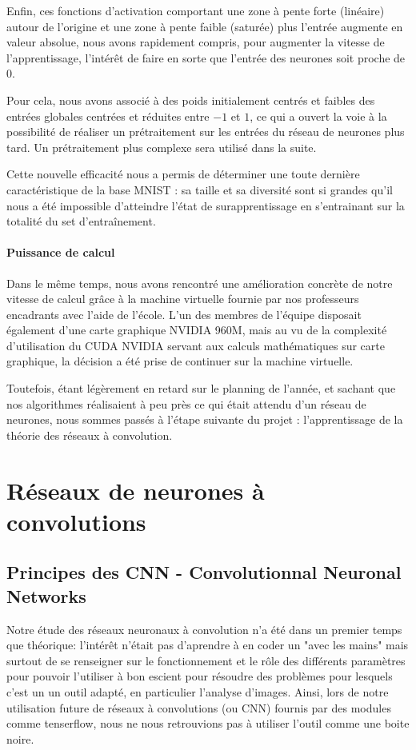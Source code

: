 \documentclass[
    10pt,
    a4paper,
    oneside,
    headinclude,footinclude,
    BCOR=5mm,
    captions=tableabove
]{scrartcl}
\begin{document}
Enfin, ces fonctions d'activation comportant une zone à pente forte (linéaire) autour de l'origine et une zone à pente faible (saturée) plus l'entrée augmente en valeur absolue, nous avons rapidement compris, pour augmenter la vitesse de l'apprentissage, l'intérêt de faire en sorte que l'entrée des neurones soit proche de $0$. 

Pour cela, nous avons associé à des poids initialement centrés et faibles des entrées globales centrées et réduites entre $-1$ et $1$, ce qui a ouvert la voie à la possibilité de réaliser un prétraitement sur les entrées du réseau de neurones plus tard. Un prétraitement plus complexe sera utilisé dans la suite. 

Cette nouvelle efficacité nous a permis de déterminer une toute dernière caractéristique de la base MNIST : sa taille et sa diversité sont si grandes qu'il nous a été impossible d'atteindre l'état de surapprentissage en s'entrainant sur la totalité du set d'entraînement.

\paragraph{Puissance de calcul}
Dans le même temps, nous avons rencontré une amélioration concrète de notre vitesse de calcul grâce à la machine virtuelle fournie par nos professeurs encadrants avec l'aide de l'école. L'un des membres de l'équipe disposait également d'une carte graphique NVIDIA 960M, mais au vu de la complexité d'utilisation du CUDA NVIDIA servant aux calculs mathématiques sur carte graphique, la décision a été prise de continuer sur la machine virtuelle.

Toutefois, étant légèrement en retard sur le planning de l'année, et sachant que nos algorithmes réalisaient à peu près ce qui était attendu d'un réseau de neurones, nous sommes passés à l'étape suivante du projet : l'apprentissage de la théorie des réseaux à convolution.

\newpage
\section{Réseaux de neurones à convolutions}

\subsection{Principes des CNN - Convolutionnal Neuronal Networks}
Notre étude des réseaux neuronaux à convolution n'a été dans un premier temps que théorique: l'intérêt n'était pas d'aprendre à en coder un "avec les mains" mais surtout de se renseigner sur le fonctionnement et le rôle des différents paramètres pour pouvoir l'utiliser à bon escient pour résoudre des problèmes pour lesquels c'est un un outil adapté, en particulier l'analyse d'images. Ainsi, lors de notre utilisation future de réseaux à convolutions (ou CNN) fournis par des modules comme tenserflow, nous ne nous retrouvions pas à utiliser l'outil comme une boite noire.
\end{document}
